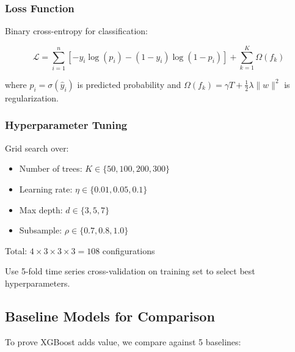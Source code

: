\documentclass[12pt,a4paper]{article}
\begin{document}
\subsubsection{Loss Function}

Binary cross-entropy for classification:

\begin{equation}
\mathcal{L} = \sum_{i=1}^{n} \left[ -y_i \log(p_i) - (1-y_i)\log(1-p_i) \right] + \sum_{k=1}^{K} \Omega(f_k)
\end{equation}

where $p_i = \sigma(\hat{y}_i)$ is predicted probability and $\Omega(f_k) = \gamma T + \frac{1}{2}\lambda\|w\|^2$ is regularization.

\subsubsection{Hyperparameter Tuning}

Grid search over:
\begin{itemize}
    \item Number of trees: $K \in \{50, 100, 200, 300\}$
    \item Learning rate: $\eta \in \{0.01, 0.05, 0.1\}$
    \item Max depth: $d \in \{3, 5, 7\}$
    \item Subsample: $\rho \in \{0.7, 0.8, 1.0\}$
\end{itemize}

Total: $4 \times 3 \times 3 \times 3 = 108$ configurations

Use 5-fold time series cross-validation on training set to select best hyperparameters.

\subsection{Baseline Models for Comparison}

To prove XGBoost adds value, we compare against 5 baselines:
\end{document}
